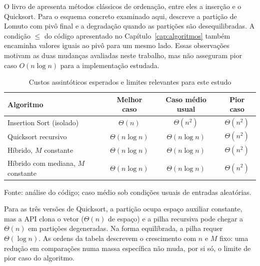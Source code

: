 O livro de  apresenta métodos clássicos de ordenação, entre eles a inserção e o Quicksort. Para o esquema concreto examinado aqui,  descreve a partição de Lomuto com pivô final e a degradação quando as partições são desequilibradas. A condição $\leq$ do código apresentado no Capítulo~\ref{cap:algoritmos} também encaminha valores iguais ao pivô para um mesmo lado. Essas observações motivam as duas mudanças avaliadas neste trabalho, mas não asseguram pior caso $O(n\log n)$ para a implementação estudada.

\begin{table}[htbp]
\centering
\caption{Custos assintóticos esperados e limites relevantes para este estudo}
\label{tab:complexidades}
\begin{tabular}{l c c c}
\hline
Algoritmo & Melhor caso & Caso médio usual & Pior caso \\
\hline
Insertion Sort (isolado) & $\Theta(n)$ & $\Theta(n^2)$ & $\Theta(n^2)$ \\
Quicksort recursivo & $\Theta(n\log n)$ & $\Theta(n\log n)$ & $\Theta(n^2)$ \\
Híbrido, $M$ constante & $\Theta(n\log n)$ & $\Theta(n\log n)$ & $\Theta(n^2)$ \\
Híbrido com mediana, $M$ constante & $\Theta(n\log n)$ & $\Theta(n\log n)$ & $\Theta(n^2)$ \\
\hline
\end{tabular}
\par\smallskip\footnotesize Fonte: análise do código; caso médio sob condições usuais de entradas aleatórias.\normalsize
\end{table}

Para as três versões de Quicksort, a partição ocupa espaço auxiliar constante, mas a API clona o vetor ($\Theta(n)$ de espaço) e a pilha recursiva pode chegar a $\Theta(n)$ em partições degeneradas. Na forma equilibrada, a pilha requer $\Theta(\log n)$. As ordens da tabela descrevem o crescimento com $n$ e $M$ fixo: uma redução em comparações numa massa específica não muda, por si só, o limite de pior caso do algoritmo.
